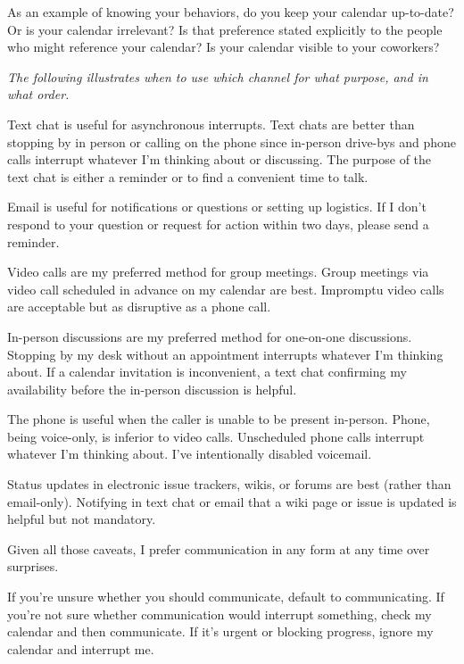 As an example of knowing your behaviors, do you keep your calendar up-to-date? Or is your calendar irrelevant? Is that preference stated explicitly to the people who might reference your calendar? Is your calendar visible to your coworkers?

\begin{mdframed}[frametitle={Communication Channel Preferences},frametitlerule=true,frametitlealignment=\centering]
\textit{The following illustrates when to use which channel for what purpose, and in what order.} 

Text chat is useful for asynchronous interrupts. Text chats are better than stopping by in person or calling on the phone since in-person drive-bys and phone calls interrupt whatever I'm thinking about or discussing. The purpose of the text chat is either a reminder or to find a convenient time to talk. 

Email is useful for notifications or questions or setting up logistics. If I don't respond to your question or request for action within two days, please send a reminder. 

Video calls are my preferred method for group meetings. Group meetings via video call scheduled in advance on my calendar are best. Impromptu video calls are acceptable but as disruptive as a phone call. 

In-person discussions are my preferred method for one-on-one discussions. Stopping by my desk  without an appointment interrupts whatever I'm thinking about. If a calendar invitation is inconvenient, a text chat confirming my availability before the in-person discussion is helpful. 

The phone is useful when the caller is unable to be present in-person. Phone, being voice-only, is inferior to video calls. Unscheduled phone calls interrupt whatever I'm thinking about. I've intentionally disabled voicemail. 

Status updates in electronic issue trackers, wikis, or forums are best (rather than email-only). Notifying in text chat or email that a wiki page or issue is updated is helpful but not mandatory. 

Given all those caveats, I prefer communication in any form at any time over surprises. 

If you're unsure whether you should communicate, default to communicating. If you're not sure whether communication would interrupt something, check my calendar and then communicate. If it's urgent or blocking progress, ignore my calendar and interrupt me. 
\label{communication_channel_preferences_example}
\end{mdframed}

